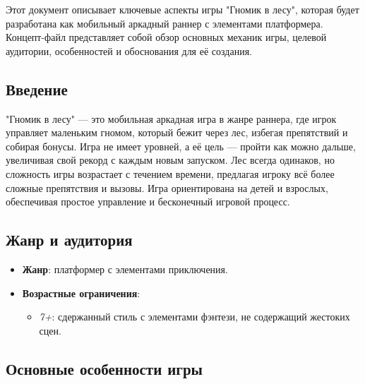 \documentclass{article}
\begin{document}
Этот документ описывает ключевые аспекты игры "Гномик в лесу", которая будет разработана как мобильный аркадный раннер с элементами платформера. Концепт-файл представляет собой обзор основных механик игры, целевой аудитории, особенностей и обоснования для её создания.

\subsection{Введение}

"Гномик в лесу" — это мобильная аркадная игра в жанре раннера, где игрок управляет маленьким гномом, который бежит через лес, избегая препятствий и собирая бонусы. Игра не имеет уровней, а её цель — пройти как можно дальше, увеличивая свой рекорд с каждым новым запуском. Лес всегда одинаков, но сложность игры возрастает с течением времени, предлагая игроку всё более сложные препятствия и вызовы. Игра ориентирована на детей и взрослых, обеспечивая простое управление и бесконечный игровой процесс.

\subsection{Жанр и аудитория}

\begin{itemize}
    \item \textbf{Жанр}: платформер с элементами приключения.
    \item \textbf{Возрастные ограничения}:
    \begin{itemize}
        \item \textit{7+}: сдержанный стиль с элементами фэнтези, не содержащий жестоких сцен.
    \end{itemize}
\end{itemize}

\subsection{Основные особенности игры}
\end{document}
